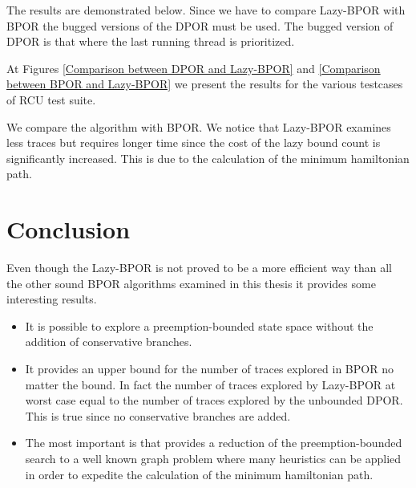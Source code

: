 The results are demonstrated below. Since we have to compare Lazy-BPOR with BPOR the bugged versions of the DPOR must be used. The bugged version
of DPOR is that where the last running thread is prioritized.

At Figures \ref{Comparison between DPOR and Lazy-BPOR} and \ref{Comparison between BPOR and Lazy-BPOR} we present the results for the various
testcases of RCU test suite.





We compare the algorithm with BPOR. We notice that Lazy-BPOR examines less traces but requires longer time since the cost of the lazy bound count is significantly
increased. This is due to the calculation of the minimum hamiltonian path.


\section{Conclusion}
Even though the Lazy-BPOR is not proved to be a more efficient way than all the other sound BPOR algorithms examined in this thesis it
provides some interesting results.

\begin{itemize}
    \item It is possible to explore a preemption-bounded state space without the addition of conservative branches.
    \item It provides an upper bound for the number of traces explored in BPOR no matter the bound. In fact the number of traces
    explored by Lazy-BPOR at worst case equal to the number of traces explored by the unbounded DPOR. This is true since no conservative
    branches are added.
    \item The most important is that provides a reduction of the preemption-bounded search to a well known graph problem where many heuristics can
    be applied in order to expedite the calculation of the minimum hamiltonian path.
\end{itemize}

